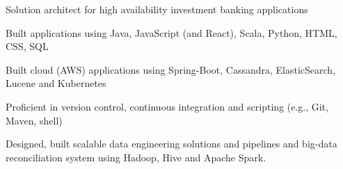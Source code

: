 \begin{cvitems}
\sectionspace
\sectionspace
\vspace{1mm}
	\fontsize{11pt}{1.4em}\bodyfontlight\upshape\color{text}
        \item {Solution architect for high availability investment banking applications}
        \item {Built applications using Java, JavaScript (and React), Scala, Python, HTML, CSS, SQL}
        \item {Built cloud (AWS) applications using Spring-Boot, Cassandra, ElasticSearch, Lucene and Kubernetes}
        \item {Proficient in version control, continuous integration and scripting (e.g., Git, Maven, shell)}
        \item {Designed, built scalable data engineering solutions and pipelines and big-data reconciliation system using Hadoop, Hive and Apache Spark.}
        \end{cvitems}
\vspace{1mm}
\sectionspace
